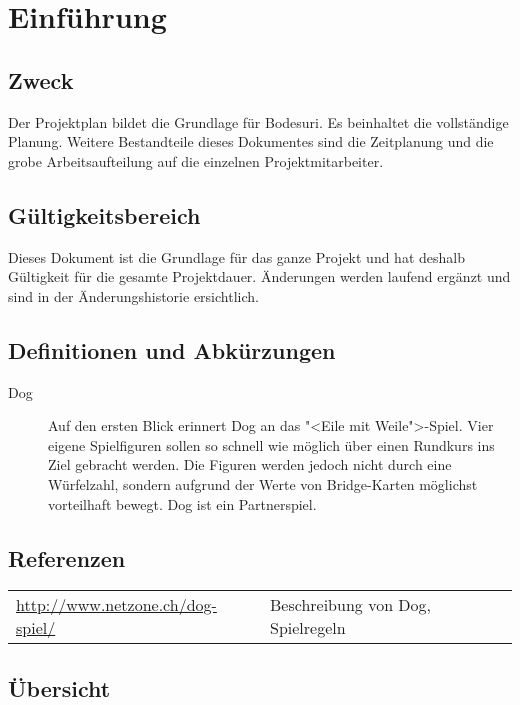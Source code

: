 \documentclass[a4paper,12pt,halfparskip,DIV14]{scrartcl}
\begin{document}


\section{Einführung}

\subsection{Zweck}

Der Projektplan bildet die Grundlage für Bodesuri. Es beinhaltet die vollständige Planung. Weitere Bestandteile dieses Dokumentes sind die Zeitplanung und die grobe Arbeitsaufteilung auf die einzelnen Projektmitarbeiter.

\subsection{Gültigkeitsbereich}

Dieses Dokument ist die Grundlage für das ganze Projekt und hat deshalb Gültigkeit für die gesamte Projektdauer. Änderungen werden laufend ergänzt und sind in der Änderungshistorie ersichtlich.

\subsection{Definitionen und Abkürzungen}

\begin{description}
	\item[Dog] Auf den ersten Blick erinnert Dog an das "<Eile mit Weile">-Spiel. Vier eigene Spielfiguren sollen so schnell wie möglich über einen Rundkurs ins Ziel gebracht werden. Die Figuren werden jedoch nicht durch eine Würfelzahl, sondern aufgrund der Werte von Bridge-Karten möglichst vorteilhaft bewegt. Dog ist ein Partnerspiel.
\end{description}

\subsection{Referenzen}

\begin{tabular}{@{}ll@{}}
\url{http://www.netzone.ch/dog-spiel/} & Beschreibung von Dog, Spielregeln
\end{tabular}

\subsection{Übersicht}
\end{document}
